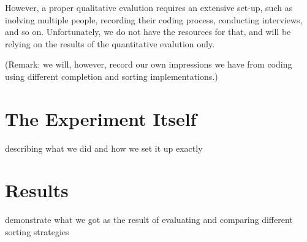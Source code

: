 However, a proper qualitative evalution requires an extensive set-up, such as inolving multiple people, recording their coding process, conducting interviews, and so on. Unfortunately, we do not have the resources for that, and will be relying on the results of the quantitative evalution only.

(Remark: we will, however, record our own impressions we have from coding using different completion and sorting implementations.)

\section{The Experiment Itself}
describing what we did and how we set it up exactly

\section{Results}
demonstrate what we got as the result of evaluating and comparing different sorting strategies